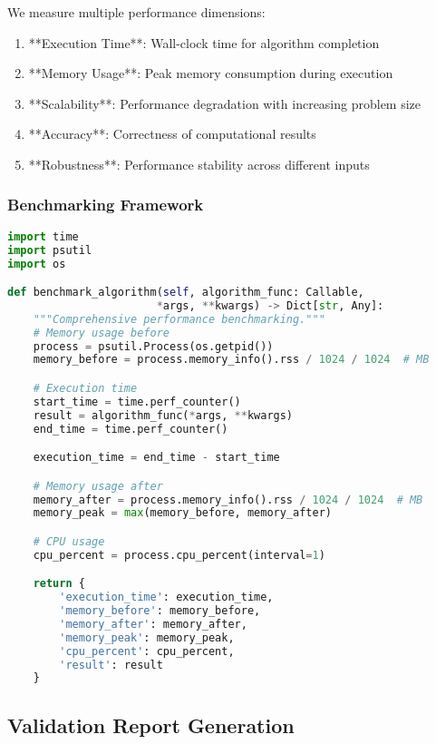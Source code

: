 We measure multiple performance dimensions:

\begin{enumerate}
    \item **Execution Time**: Wall-clock time for algorithm completion
    \item **Memory Usage**: Peak memory consumption during execution
    \item **Scalability**: Performance degradation with increasing problem size
    \item **Accuracy**: Correctness of computational results
    \item **Robustness**: Performance stability across different inputs
\end{enumerate}

\subsubsection{Benchmarking Framework}

\begin{lstlisting}[language=Python, caption=Performance benchmarking]
import time
import psutil
import os

def benchmark_algorithm(self, algorithm_func: Callable,
                       *args, **kwargs) -> Dict[str, Any]:
    """Comprehensive performance benchmarking."""
    # Memory usage before
    process = psutil.Process(os.getpid())
    memory_before = process.memory_info().rss / 1024 / 1024  # MB

    # Execution time
    start_time = time.perf_counter()
    result = algorithm_func(*args, **kwargs)
    end_time = time.perf_counter()

    execution_time = end_time - start_time

    # Memory usage after
    memory_after = process.memory_info().rss / 1024 / 1024  # MB
    memory_peak = max(memory_before, memory_after)

    # CPU usage
    cpu_percent = process.cpu_percent(interval=1)

    return {
        'execution_time': execution_time,
        'memory_before': memory_before,
        'memory_after': memory_after,
        'memory_peak': memory_peak,
        'cpu_percent': cpu_percent,
        'result': result
    }
\end{lstlisting}

\subsection{Validation Report Generation}

